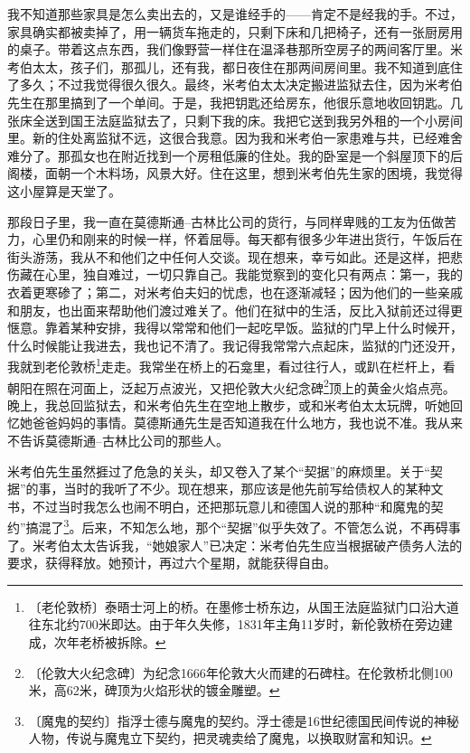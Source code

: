 \documentclass[12pt,UTF-8,openany]{ctexbook}
\begin{document}
\begin{large}
    我不知道那些家具是怎么卖出去的，又是谁经手的——肯定不是经我的手。不过，家具确实都被卖掉了，用一辆货车拖走的，只剩下床和几把椅子，还有一张厨房用的桌子。带着这点东西，我们像野营一样住在温泽巷那所空房子的两间客厅里。米考伯太太，孩子们，那孤儿，还有我，都日夜住在那两间房间里。我不知道到底住了多久；不过我觉得很久很久。最终，米考伯太太决定搬进监狱去住，因为米考伯先生在那里搞到了一个单间。于是，我把钥匙还给房东，他很乐意地收回钥匙。几张床全送到国王法庭监狱去了，只剩下我的床。我把它送到我另外租的一个小房间里。新的住处离监狱不远，这很合我意。因为我和米考伯一家患难与共，已经难舍难分了。那孤女也在附近找到一个房租低廉的住处。我的卧室是一个斜屋顶下的后阁楼，面朝一个木料场，风景大好。住在这里，想到米考伯先生家的困境，我觉得这小屋算是天堂了。
    
    那段日子里，我一直在莫德斯通–古林比公司的货行，与同样卑贱的工友为伍做苦力，心里仍和刚来的时候一样，怀着屈辱。每天都有很多少年进出货行，午饭后在街头游荡，我从不和他们之中任何人交谈。现在想来，幸亏如此。还是这样，把悲伤藏在心里，独自难过，一切只靠自己。我能觉察到的变化只有两点：第一，我的衣着更寒碜了；第二，对米考伯夫妇的忧虑，也在逐渐减轻；因为他们的一些亲戚和朋友，也出面来帮助他们渡过难关了。他们在狱中的生活，反比入狱前还过得更惬意。靠着某种安排，我得以常常和他们一起吃早饭。监狱的门早上什么时候开，什么时候能让我进去，我也记不清了。我记得我常常六点起床，监狱的门还没开，我就到老伦敦桥\footnote{〔老伦敦桥〕泰晤士河上的桥。在墨修士桥东边，从国王法庭监狱门口沿大道往东北约700米即达。由于年久失修，1831年主角11岁时，新伦敦桥在旁边建成，次年老桥被拆除。}走走。我常坐在桥上的石龛里，看过往行人，或趴在栏杆上，看朝阳在照在河面上，泛起万点波光，又把伦敦大火纪念碑\footnote{〔伦敦大火纪念碑〕为纪念1666年伦敦大火而建的石碑柱。在伦敦桥北侧100米，高62米，碑顶为火焰形状的镀金雕塑。}顶上的黄金火焰点亮。晚上，我总回监狱去，和米考伯先生在空地上散步，或和米考伯太太玩牌，听她回忆她爸爸妈妈的事情。莫德斯通先生是否知道我在什么地方，我也说不准。我从来不告诉莫德斯通–古林比公司的那些人。
    
    米考伯先生虽然捱过了危急的关头，却又卷入了某个“契据”的麻烦里。关于“契据”的事，当时的我听了不少。现在想来，那应该是他先前写给债权人的某种文书，不过当时我怎么也闹不明白，还把那玩意儿和德国人说的那种“和魔鬼的契约”搞混了\footnote{〔魔鬼的契约〕指浮士德与魔鬼的契约。浮士德是16世纪德国民间传说的神秘人物，传说与魔鬼立下契约，把灵魂卖给了魔鬼，以换取财富和知识。}。后来，不知怎么地，那个“契据”似乎失效了。不管怎么说，不再碍事了。米考伯太太告诉我，“她娘家人”已决定：米考伯先生应当根据破产债务人法的要求，获得释放。她预计，再过六个星期，就能获得自由。
    

\end{large}
\end{document}
